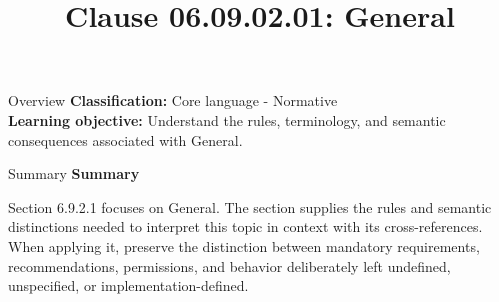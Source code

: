 \documentclass[10pt,letterpaper]{article}
\title{Clause 06.09.02.01: General}
\author{}
\date{}
\begin{document}
\maketitle
\begin{CornellOverviewBox}{Overview}
\textbf{Classification:} Core language - Normative\\[2pt]
\textbf{Learning objective:} Understand the rules, terminology, and semantic consequences associated with General.
\end{CornellOverviewBox}\begin{CornellSummaryBox}{Summary}
{\sffamily\bfseries\color{Accent} Summary}\par\vspace{3pt}Section 6.9.2.1 focuses on General. The section supplies the rules and semantic distinctions needed to interpret this topic in context with its cross-references. When applying it, preserve the distinction between mandatory requirements, recommendations, permissions, and behavior deliberately left undefined, unspecified, or implementation-defined.
\end{CornellSummaryBox}
\end{document}
